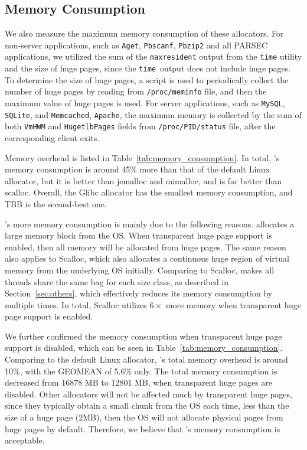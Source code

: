 \subsection{Memory Consumption}
\label{sec:memory}

We also measure the maximum memory consumption of these allocators. For non-server applications, such as \texttt{Aget}, \texttt{Pbscanf}, \texttt{Pbzip2} and all PARSEC applications, we utilized the sum of the \texttt{maxresident} output from the \texttt{time} utility and the size of huge pages, since the \texttt{time }output does not include huge pages. 
To determine the size of huge pages, a script is used to periodically collect the number of huge pages by reading from \texttt{/proc/meminfo} file, and then the maximum value of huge pages is used. 
For server applications, such as \texttt{MySQL}, \texttt{SQLite}, and \texttt{Memcached}, \texttt{Apache}, the maximum memory is collected by the sum of both \texttt{VmHWM} and \texttt{HugetlbPages} fields from \texttt{/proc/PID/status} file, after the corresponding client exits. 


% 

Memory overhead is listed in Table~\ref{tab:memory_consumption}. In total, \NM{}'s memory consumption is around 45\% more than that of the default Linux allocator, but it is better than jemalloc and mimalloc, and is far better than scalloc.  Overall, the Glibc allocator has the smallest memory consumption, and TBB is the second-best one. 
 
\NM{}'s more memory consumption is mainly due to the following reasons. \NM{} allocates a large memory block from the OS. When transparent huge page support is enabled, then all memory will be allocated from huge pages. The same reason also applies to Scalloc, which also allocates a continuous huge region of virtual memory from the underlying OS initially. Comparing to Scalloc, \NM{} makes all threads share the same bag for each size class, as described in Section~\ref{sec:others}, which effectively reduces its memory consumption by multiple times. In total, Scalloc utilizes $6\times$ more memory when transparent huge page support is enabled.  

We further confirmed the memory consumption when transparent huge page support is disabled, which can be seen in Table~\ref{tab:memory_consumption}. Comparing to the default Linux allocator, \NM{}'s total memory overhead is around 10\%, with the GEOMEAN of 5.6\% only. The total memory consumption is decreased from 16878 MB to 12801 MB,  when transparent huge pages are disabled. Other allocators will not be affected much by transparent huge pages, since they typically obtain a small chunk from the OS each time, less than the size of a huge page (2MB), then the OS will not allocate physical pages from huge pages by default.  
Therefore, we believe that \NM{}'s memory consumption is acceptable. 

